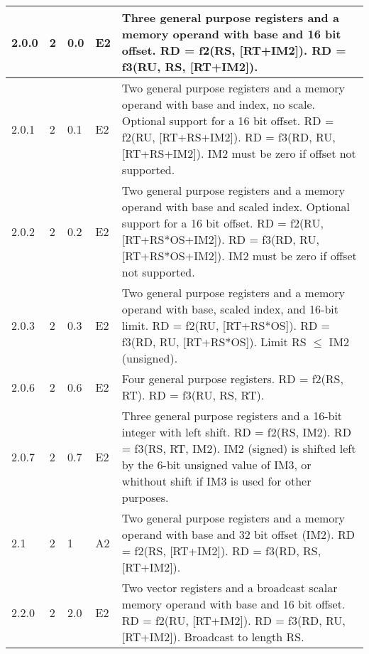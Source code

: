 \documentclass[forwardcom.tex]{subfiles}
\begin{document}
\begin{longtable} {|p{10mm}|p{6mm}|p{9mm}|p{7mm}|p{80mm}|}
\hline
2.0.0 & 2 & 0.0  & E2 & Three general purpose registers and a memory operand with base  and 16 bit offset.\newline 
RD = f2(RS, [RT+IM2]). RD = f3(RU, RS, [RT+IM2]).\\

\hline
2.0.1 & 2 & 0.1  & E2 & Two general purpose registers and a memory operand with base and index, no scale. Optional support for a 16 bit offset.\newline 
RD = f2(RU, [RT+RS+IM2]). RD = f3(RD, RU, [RT+RS+IM2]). IM2 must be zero if offset not supported.\\

\hline
2.0.2 & 2 & 0.2  & E2 & Two general purpose registers and a memory operand with base and scaled index. Optional support for a 16 bit offset.\newline 
RD = f2(RU, [RT+RS*OS+IM2]). RD = f3(RD, RU, [RT+RS*OS+IM2]). IM2 must be zero if offset not supported.\\

\hline
2.0.3 & 2 & 0.3  & E2 & Two general purpose registers and a memory operand with base, scaled index, and 16-bit limit.\newline 
RD = f2(RU, [RT+RS*OS]). RD = f3(RD, RU, [RT+RS*OS]). Limit RS $\leq$ IM2 (unsigned).\\

\hline
2.0.6 & 2 & 0.6  & E2 & Four general purpose registers.\newline 
RD = f2(RS, RT). RD = f3(RU, RS, RT).\\

\hline
2.0.7 & 2 & 0.7  & E2 & Three general purpose registers and a 16-bit integer with left shift.\newline 
RD = f2(RS, IM2). RD = f3(RS, RT, IM2). 
IM2 (signed) is shifted left by the 6-bit unsigned value of IM3, or whithout shift if IM3 is used for other purposes. \\

\hline
2.1 & 2 & 1 & A2 & Two general purpose registers and a memory operand with base and 32 bit offset (IM2). \newline 
RD = f2(RS, [RT+IM2]). RD = f3(RD, RS, [RT+IM2]).\\

\hline
2.2.0 & 2 & 2.0 & E2 & Two vector registers and a broadcast scalar memory operand with base  and 16 bit offset.\newline 
RD = f2(RU, [RT+IM2]). RD = f3(RD, RU, [RT+IM2]). Broadcast to length RS.\\


\end{longtable}
\end{document}
